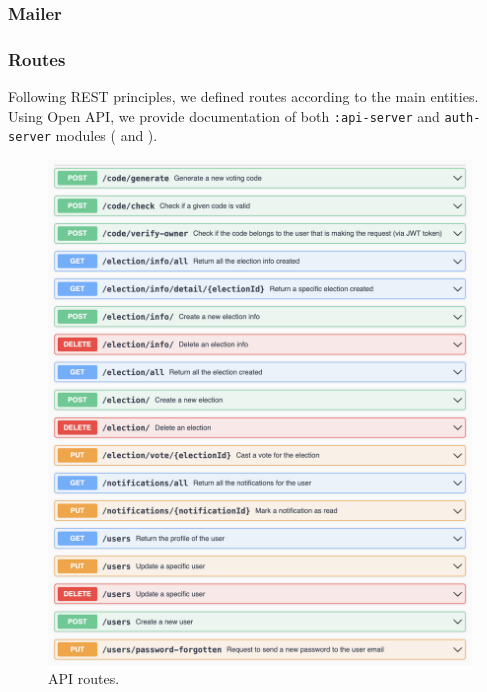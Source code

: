 \documentclass{scrartcl}
\begin{document}
\subsubsection{Mailer}


\subsubsection{Routes}

Following REST principles, we defined routes according to the main entities.
Using Open API, we provide documentation of both \texttt{:api-server} and \texttt{auth-server} modules ( and ).


\begin{figure}
    \centering
    \includegraphics[width=\textwidth]{./figures/backend-routes/api.png}
    \caption{API routes.}
    \label{fig:backend-routes-api}
\end{figure}
\end{document}
